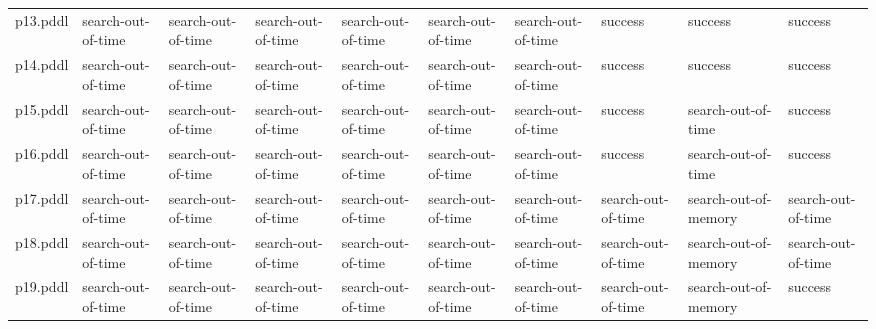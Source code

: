 \documentclass{article}
\begin{document}
\begin{tabular}{@{}lrrrrrrrrr@{}}
p13.pddl & \multicolumn{1}{|l|}{search-out-of-time} & \multicolumn{1}{|l|}{search-out-of-time} & \multicolumn{1}{|l|}{search-out-of-time} & \multicolumn{1}{|l|}{search-out-of-time} & \multicolumn{1}{|l|}{search-out-of-time} & \multicolumn{1}{|l|}{search-out-of-time} & \multicolumn{1}{|l|}{success} & \multicolumn{1}{|l|}{success} & \multicolumn{1}{|l|}{success} \\
p14.pddl & \multicolumn{1}{|l|}{search-out-of-time} & \multicolumn{1}{|l|}{search-out-of-time} & \multicolumn{1}{|l|}{search-out-of-time} & \multicolumn{1}{|l|}{search-out-of-time} & \multicolumn{1}{|l|}{search-out-of-time} & \multicolumn{1}{|l|}{search-out-of-time} & \multicolumn{1}{|l|}{success} & \multicolumn{1}{|l|}{success} & \multicolumn{1}{|l|}{success} \\
p15.pddl & \multicolumn{1}{|l|}{search-out-of-time} & \multicolumn{1}{|l|}{search-out-of-time} & \multicolumn{1}{|l|}{search-out-of-time} & \multicolumn{1}{|l|}{search-out-of-time} & \multicolumn{1}{|l|}{search-out-of-time} & \multicolumn{1}{|l|}{search-out-of-time} & \multicolumn{1}{|l|}{success} & \multicolumn{1}{|l|}{search-out-of-time} & \multicolumn{1}{|l|}{success} \\
p16.pddl & \multicolumn{1}{|l|}{search-out-of-time} & \multicolumn{1}{|l|}{search-out-of-time} & \multicolumn{1}{|l|}{search-out-of-time} & \multicolumn{1}{|l|}{search-out-of-time} & \multicolumn{1}{|l|}{search-out-of-time} & \multicolumn{1}{|l|}{search-out-of-time} & \multicolumn{1}{|l|}{success} & \multicolumn{1}{|l|}{search-out-of-time} & \multicolumn{1}{|l|}{success} \\
p17.pddl & \multicolumn{1}{|l|}{search-out-of-time} & \multicolumn{1}{|l|}{search-out-of-time} & \multicolumn{1}{|l|}{search-out-of-time} & \multicolumn{1}{|l|}{search-out-of-time} & \multicolumn{1}{|l|}{search-out-of-time} & \multicolumn{1}{|l|}{search-out-of-time} & \multicolumn{1}{|l|}{search-out-of-time} & \multicolumn{1}{|l|}{search-out-of-memory} & \multicolumn{1}{|l|}{search-out-of-time} \\
p18.pddl & \multicolumn{1}{|l|}{search-out-of-time} & \multicolumn{1}{|l|}{search-out-of-time} & \multicolumn{1}{|l|}{search-out-of-time} & \multicolumn{1}{|l|}{search-out-of-time} & \multicolumn{1}{|l|}{search-out-of-time} & \multicolumn{1}{|l|}{search-out-of-time} & \multicolumn{1}{|l|}{search-out-of-time} & \multicolumn{1}{|l|}{search-out-of-memory} & \multicolumn{1}{|l|}{search-out-of-time} \\
p19.pddl & \multicolumn{1}{|l|}{search-out-of-time} & \multicolumn{1}{|l|}{search-out-of-time} & \multicolumn{1}{|l|}{search-out-of-time} & \multicolumn{1}{|l|}{search-out-of-time} & \multicolumn{1}{|l|}{search-out-of-time} & \multicolumn{1}{|l|}{search-out-of-time} & \multicolumn{1}{|l|}{search-out-of-time} & \multicolumn{1}{|l|}{search-out-of-memory} & \multicolumn{1}{|l|}{success} \\

\end{tabular}
\end{document}
